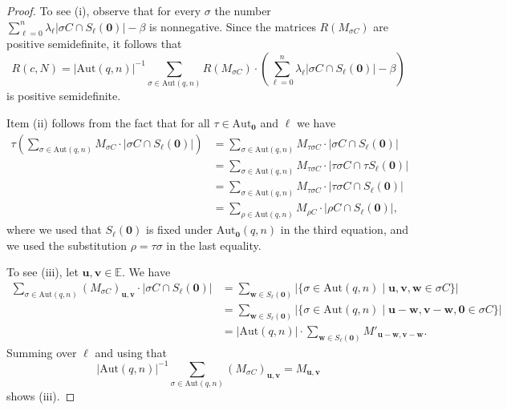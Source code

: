 \documentclass[10pt,a4paper]{article}
\newcommand{\E}{\mathbb{E}}
\theoremstyle{definition}
\newcommand{\uu}{\mathbf{u}}
\newcommand{\vv}{\mathbf{v}}
\newcommand{\ww}{\mathbf{w}}
\newcommand{\zero}{\mathbf{0}}
\newcommand{\Aut}{\mathrm{Aut}}
\newcommand{\AutZ}{\mathrm{Aut}_{\zero}}
\begin{document}
\begin{proof}
To see (i), observe that for every $\sigma$ the number $\sum_{\ell=0}^n\lambda_\ell|\sigma C\cap  S_{\ell}(\zero)|-\beta$ is nonnegative. Since the matrices $R(M_{\sigma C})$ are positive semidefinite, it follows that 
\[
R(c,N)=|\Aut(q,n)|^{-1} \sum_{\sigma \in \Aut(q,n)} R(M_{\sigma C})\cdot\left(\sum_{\ell=0}^n\lambda_\ell |\sigma C\cap  S_{\ell}(\zero)|-\beta\right)
\]
is positive semidefinite.

Item (ii) follows from the fact that for all $\tau\in \AutZ$ and $\ell$ we have
\begin{align*}
\tau\left( \sum_{\sigma\in \Aut(q,n)} M_{\sigma C}\cdot |\sigma C\cap  S_{\ell}(\zero)|\right)
&=\sum_{\sigma\in \Aut(q,n)} M_{\tau\sigma C}\cdot |\sigma C\cap  S_{\ell}(\zero)|\\
&=\sum_{\sigma\in \Aut(q,n)} M_{\tau\sigma C}\cdot |\tau \sigma C\cap \tau  S_{\ell}(\zero)|\\
&=\sum_{\sigma\in \Aut(q,n)} M_{\tau\sigma C}\cdot |\tau \sigma C\cap  S_{\ell}(\zero)|\\
&=\sum_{\rho\in \Aut(q,n)} M_{\rho C}\cdot |\rho C\cap  S_{\ell}(\zero)|,
\end{align*}
where we used that $ S_{\ell}(\zero)$ is fixed under $\AutZ(q,n)$ in the third equation, and we used the substitution $\rho=\tau\sigma$ in the last equality.


To see (iii), let $\uu,\vv\in \E$. We have 
\begin{align*}
\sum_{\sigma \in \Aut(q,n)} (M_{\sigma C})_{\uu,\vv}\cdot |\sigma C \cap  S_{\ell}(\zero)| 
&=\sum_{\ww \in  S_{\ell}(\zero)} |\{\sigma \in \Aut(q,n) \mid  \uu, \vv, \ww \in \sigma C\}| \\
&=\sum_{\ww \in  S_{\ell}(\zero)} |\{\sigma \in \Aut(q,n) \mid \uu-\ww, \vv-\ww, \zero \in \sigma C\}| \\
&= |\Aut(q,n)|\cdot\sum_{\ww \in S_{\ell}(\zero)} M'_{\uu-\ww,\vv-\ww}.
\end{align*}
Summing over $\ell$ and using that 
\[
|\Aut(q,n)|^{-1}\sum_{\sigma\in \Aut(q,n)} (M_{\sigma C})_{\uu,\vv}=M_{\uu,\vv}
\]
shows (iii).


\end{proof}
\end{document}
